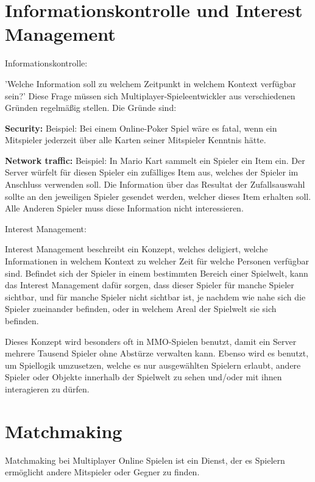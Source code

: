 \section{Informationskontrolle und Interest Management}

\textsf{\Large Informationskontrolle:}

'Welche Information soll zu welchem Zeitpunkt in welchem Kontext verfügbar sein?' Diese Frage müssen sich Multiplayer-Spieleentwickler aus verschiedenen Gründen regelmäßig stellen.
Die Gründe sind:

\textbf{Security:}
Beispiel: Bei einem Online-Poker Spiel wäre es fatal, wenn ein Mitspieler jederzeit über alle Karten seiner Mitspieler Kenntnis hätte. 

\textbf{Network traffic:}
Beispiel: In Mario Kart sammelt ein Spieler ein Item ein. Der Server würfelt für diesen Spieler ein zufälliges Item aus, welches der Spieler im Anschluss verwenden soll. Die Information über das Resultat der Zufallsauswahl sollte an den jeweiligen Spieler gesendet werden, welcher dieses Item erhalten soll. Alle Anderen Spieler muss diese Information nicht interessieren.
 
\textsf{\Large Interest Management:}
\label{interest_management}

Interest Management beschreibt ein Konzept, welches deligiert, welche Informationen in welchem Kontext zu welcher Zeit für welche Personen verfügbar sind. Befindet sich der Spieler in einem bestimmten Bereich einer Spielwelt, kann das Interest Management dafür sorgen, dass dieser Spieler für manche Spieler sichtbar, und für manche Spieler nicht sichtbar ist, je nachdem wie nahe sich die Spieler zueinander befinden, oder in welchem Areal der Spielwelt sie sich befinden.

Dieses Konzept wird besonders oft in MMO-Spielen \cite{Wikipedia.2021i} benutzt, damit ein Server mehrere Tausend Spieler ohne Abstürze verwalten kann. Ebenso wird es benutzt, um Spiellogik umzusetzen, welche es nur ausgewählten Spielern erlaubt, andere Spieler oder Objekte innerhalb der Spielwelt zu sehen und/oder mit ihnen interagieren zu dürfen.

\cite{Smed.2002c}


\section{Matchmaking}

Matchmaking bei Multiplayer Online Spielen ist ein Dienst, der es Spielern ermöglicht andere Mitspieler oder Gegner zu finden. \cite{.2014}

